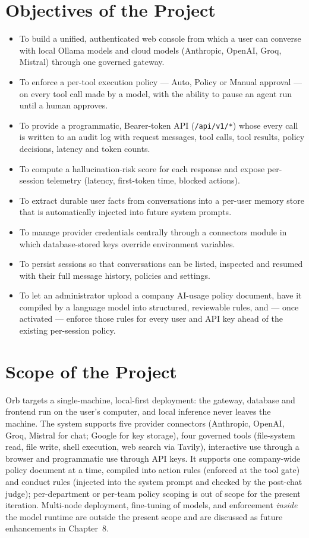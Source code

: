 \documentclass[12pt,a4paper,oneside]{report}
\begin{document}
\section{Objectives of the Project}
\begin{itemize}
  \item To build a unified, authenticated web console from which a
        user can converse with local Ollama models and cloud models
        (Anthropic, OpenAI, Groq, Mistral) through one governed
        gateway.
  \item To enforce a per-tool execution policy --- Auto, Policy or
        Manual approval --- on every tool call made by a model, with
        the ability to pause an agent run until a human approves.
  \item To provide a programmatic, Bearer-token API
        (\texttt{/api/v1/*}) whose every call is written to an audit
        log with request messages, tool calls, tool results, policy
        decisions, latency and token counts.
  \item To compute a hallucination-risk score for each response and
        expose per-session telemetry (latency, first-token time,
        blocked actions).
  \item To extract durable user facts from conversations into a
        per-user memory store that is automatically injected into
        future system prompts.
  \item To manage provider credentials centrally through a connectors
        module in which database-stored keys override environment
        variables.
  \item To persist sessions so that conversations can be listed,
        inspected and resumed with their full message history,
        policies and settings.
  \item To let an administrator upload a company AI-usage policy
        document, have it compiled by a language model into
        structured, reviewable rules, and --- once activated ---
        enforce those rules for every user and API key ahead of the
        existing per-session policy.
\end{itemize}

\section{Scope of the Project}
Orb targets a single-machine, local-first deployment: the gateway,
database and frontend run on the user's computer, and local inference
never leaves the machine. The system supports five provider
connectors (Anthropic, OpenAI, Groq, Mistral for chat; Google for key
storage), four governed tools (file-system read, file write, shell
execution, web search via Tavily), interactive use through a browser
and programmatic use through API keys. It supports one company-wide
policy document at a time, compiled into action rules (enforced at
the tool gate) and conduct rules (injected into the system prompt and
checked by the post-chat judge); per-department or per-team policy
scoping is out of scope for the present iteration. Multi-node deployment,
fine-tuning of models, and enforcement \emph{inside} the model runtime
are outside the present scope and are discussed as future
enhancements in Chapter~8.
\end{document}
